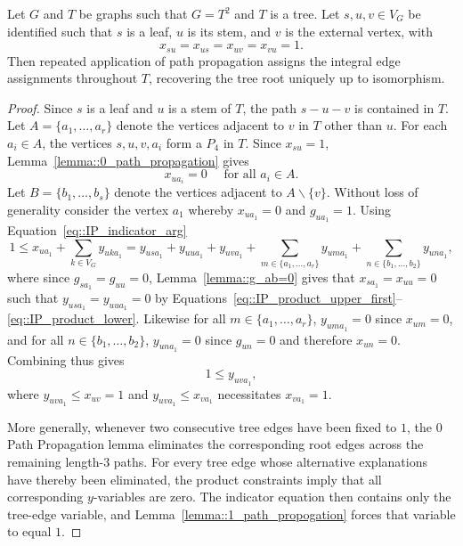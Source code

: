 
\begin{lemma}[Propagation] \label{lemma::propagation}
  Let $G$ and $T$ be graphs such that $G=T^2$ and $T$ is a tree. Let $s,u,v \in V_G$ be identified such that $s$ is a leaf, $u$ is its stem, and $v$ is the external vertex, with
  \[
  x_{su}=x_{us}=x_{uv}=x_{vu}=1.
  \]
  Then repeated application of path propagation assigns the integral edge assignments throughout $T$, recovering the tree root uniquely up to isomorphism.
\end{lemma}

\begin{proof}
  Since $s$ is a leaf and $u$ is a stem of $T$, the path $s-u-v$ is contained in $T$. Let $A=\{a_1,\ldots,a_r\}$ denote the vertices adjacent to $v$ in $T$ other than $u$. For each $a_i\in A$, the vertices $s,u,v,a_i$ form a $P_4$ in $T$. Since $x_{su}=1$, Lemma~\eqref{lemma::0_path_propagation} gives
  \[
  x_{ua_i}=0 \quad \text{ for all } a_i \in A.
  \]
  Let $B=\{b_1, \ldots, b_s\}$ denote the vertices adjacent to $A \backslash \{v\}$. Without loss of generality consider the vertex $a_1$ whereby $x_{ua_1}=0$ and $g_{ua_1} = 1$. Using Equation~\eqref{eq::IP_indicator_arg}
  \[
  1 \leq x_{ua_1} + \sum_{k \in V_G} y_{uka_1} = y_{usa_1} + y_{uua_1} + y_{uva_1} + \sum_{m \in \{a_1, \ldots, a_r\}}y_{u m a_1} + \sum_{n \in \{b_1, \ldots, b_2\}}y_{u n a_1}, 
  \]
  where since $g_{sa_1} = g_{uu} = 0$, Lemma~\eqref{lemma::g_ab=0} gives that $x_{sa_1} = x_{uu} = 0$ such that $ y_{usa_1}  = y_{uua_1} = 0$ by Equations~\eqref{eq::IP_product_upper_first}--\eqref{eq::IP_product_lower}. Likewise for all $m \in \{a_1, \ldots, a_r\}$, $y_{u m a_1} = 0$ since $x_{u m} = 0$, and for all  $n \in \{b_1, \ldots, b_2\}$, $y_{u n a_1} = 0$ since $g_{u n} = 0$ and therefore $x_{u n} = 0$. 
  Combining thus gives 
  \[
  1 \leq y_{uva_1}, 
  \]
  where $y_{uva_1} \leq x_{uv} = 1$ and $y_{uva_1} \leq x_{va_1}$ necessitates $x_{va_1} = 1$.   

  More generally, whenever two consecutive tree edges have been fixed
  to $1$, the $0$ Path Propagation lemma eliminates the corresponding
  root edges across the remaining length-$3$ paths. For every tree edge
  whose alternative explanations have thereby been eliminated, the
  product constraints imply that all corresponding $y$-variables are
  zero. The indicator equation then contains only the tree-edge variable,
  and Lemma~\eqref{lemma::1_path_propogation} forces that variable to
  equal $1$.


\end{proof}
